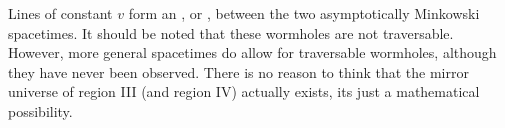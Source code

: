 \documentclass[fleqn]{NotesClass}
\begin{document}
    Lines of constant \(v\) form an , or , between the two asymptotically Minkowski spacetimes.
    It should be noted that these wormholes are not traversable.
    However, more general spacetimes do allow for traversable wormholes, although they have never been observed.
    There is no reason to think that the mirror universe of region III (and region IV) actually exists, its just a mathematical possibility.
    
    
    \appendixpage
    \begin{appendices}
        
    \end{appendices}
    
    \backmatter
    \renewcommand{\glossaryname}{Acronyms}
    \printglossary[acronym]
    \printindex
\end{document}
